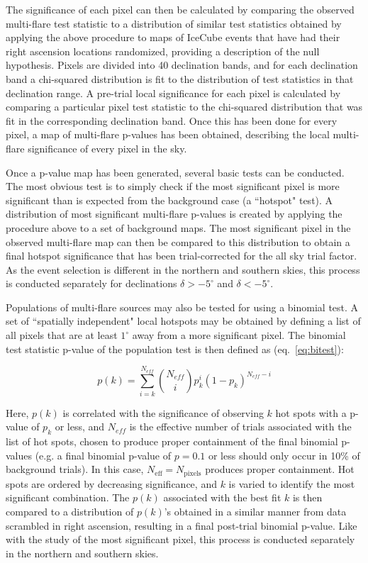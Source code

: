 The significance of each pixel can then be calculated by comparing the observed multi-flare test statistic to a distribution of similar test statistics obtained by applying the above procedure to maps of IceCube events that have had their right ascension locations randomized, providing a description of the null hypothesis. Pixels are divided into 40 declination bands, and for each declination band a chi-squared distribution is fit to the distribution of test statistics in that declination range. A pre-trial local significance for each pixel is calculated by comparing a particular pixel test statistic to the chi-squared distribution that was fit in the corresponding declination band. Once this has been done for every pixel, a map of multi-flare p-values has been obtained, describing the local multi-flare significance of every pixel in the sky.

Once a p-value map has been generated, several basic tests can be conducted. The most obvious test is to simply check if the most significant pixel is more significant than is expected from the background case (a ``hotspot" test). A distribution of most significant multi-flare p-values is created by applying the procedure above to a set of background maps. The most significant pixel in the observed multi-flare map can then be compared to this distribution to obtain a final hotspot significance that has been trial-corrected for the all sky trial factor. As the event selection is different in the northern and southern skies, this process is conducted separately for declinations $\delta>-5^{\circ}$ and $\delta<-5^{\circ}$.

Populations of multi-flare sources may also be tested for using a binomial test. A set of ``spatially independent" local hotspots may be obtained by defining a list of all pixels that are at least $1^{\circ}$ away from a more significant pixel. The binomial test statistic p-value of the population test is then defined as (eq.~\ref{eq:bitest}):

\begin{equation}
    p(k) = \sum_{i=k}^{N_{eff}} \binom{N_{eff}}{i}p_k^i(1-p_k)^{N_{eff}-i}
    \label{eq:bitest}
\end{equation}

Here, $p(k)$ is correlated with the significance of observing $k$ hot spots with a p-value of $p_k$ or less, and $N_{eff}$ is the effective number of trials associated with the list of hot spots, chosen to produce proper containment of the final binomial p-values (e.g. a final binomial p-value of $p=0.1$ or less should only occur in 10\% of background trials). In this case, $N_{\mathrm{eff}}=N_{\mathrm{pixels}}$ produces proper containment. Hot spots are ordered by decreasing significance, and $k$ is varied to identify the most significant combination. The $p(k)$ associated with the best fit $k$ is then compared to a distribution of $p(k)$'s obtained in a similar manner from data scrambled in right ascension, resulting in a final post-trial binomial p-value. Like with the study of the most significant pixel, this process is conducted separately in the northern and southern skies. 

